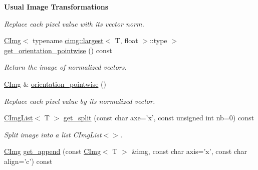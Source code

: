 \begin{Indent}{\bf Usual Image Transformations}
\begin{DoxyCompactItemize}
\begin{DoxyCompactList}\small\item\em Replace each pixel value with its vector norm. \item\end{DoxyCompactList}\item 
\hyperlink{structcimg__library_1_1_c_img}{CImg}$<$ typename \hyperlink{structcimg__library_1_1cimg_1_1largest}{cimg::largest}$<$ T, float $>$::type $>$ \hyperlink{structcimg__library_1_1_c_img_aaa04a8797ca311168ad2b516db361b15}{get\_\-orientation\_\-pointwise} () const 
\begin{DoxyCompactList}\small\item\em Return the image of normalized vectors. \item\end{DoxyCompactList}\item 
\hyperlink{structcimg__library_1_1_c_img}{CImg} \& \hyperlink{structcimg__library_1_1_c_img_a361a2f26fd4692a9f429982d2a071985}{orientation\_\-pointwise} ()
\begin{DoxyCompactList}\small\item\em Replace each pixel value by its normalized vector. \item\end{DoxyCompactList}\item 
\hypertarget{structcimg__library_1_1_c_img_a4c5863135f8535b0603cd5e5f9eb48df}{
\hyperlink{structcimg__library_1_1_c_img_list}{CImgList}$<$ T $>$ \hyperlink{structcimg__library_1_1_c_img_a4c5863135f8535b0603cd5e5f9eb48df}{get\_\-split} (const char axe='x', const unsigned int nb=0) const }
\label{structcimg__library_1_1_c_img_a4c5863135f8535b0603cd5e5f9eb48df}

\begin{DoxyCompactList}\small\item\em Split image into a list CImgList$<$$>$. \item\end{DoxyCompactList}\item 
\hypertarget{structcimg__library_1_1_c_img_a17c3656abd8d7e1be4932ee1cddc4692}{
\hyperlink{structcimg__library_1_1_c_img}{CImg} \hyperlink{structcimg__library_1_1_c_img_a17c3656abd8d7e1be4932ee1cddc4692}{get\_\-append} (const \hyperlink{structcimg__library_1_1_c_img}{CImg}$<$ T $>$ \&img, const char axis='x', const char align='c') const }
\label{structcimg__library_1_1_c_img_a17c3656abd8d7e1be4932ee1cddc4692}


\end{DoxyCompactItemize}
\end{Indent}
